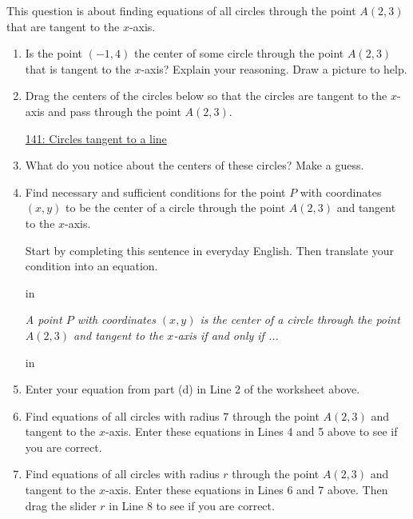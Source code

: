 \documentclass{ximera}
\newcommand{\pskip}{\vskip 0.1 in}
\begin{document}
\begin{question}  \label{QKdf3Dfer33}
This question is about finding equations of all circles through the point $A(2,3)$ that are tangent to the $x$-axis.
\begin{enumerate}

\item Is the point $(-1,4)$ the center of some circle through the point $A(2,3)$ that is tangent to the $x$-axis? Explain your reasoning. Draw a picture to help.

\item Drag the centers of the circles below so that the circles are tangent to the $x$-axis and pass through the point $A(2,3)$.

\begin{onlineOnly}
    \begin{center}
\end{center}
\end{onlineOnly}

\href{https://www.desmos.com/calculator/ghthxwn4uk}{141: Circles tangent to a line}

\item What do you notice about the centers of these circles? Make a guess.

\item Find necessary and sufficient conditions for the point $P$ with coordinates $(x,y)$ to be the center of a circle through the point $A(2,3)$ and tangent to the $x$-axis.

Start by completing this sentence in everyday English. Then translate your condition into an equation.

\pskip

\emph{A point $P$ with coordinates $(x,y)$ is the center of a circle through the point $A(2,3)$ and tangent to the $x$-axis if and only if ...}

\pskip

\item Enter your equation from part (d) in Line 2 of the worksheet above.

\item Find equations of all circles with radius $7$ through the point $A(2,3)$ and tangent to the $x$-axis. Enter these equations in Lines 4 and 5 above to see if you are correct.

\item Find equations of all circles with radius $r$ through the point $A(2,3)$ and tangent to the $x$-axis. Enter these equations in Lines 6 and 7 above. Then drag the slider $r$ in Line 8 to see if you are correct.
 

\end{enumerate}
\end{question}
\end{document}
